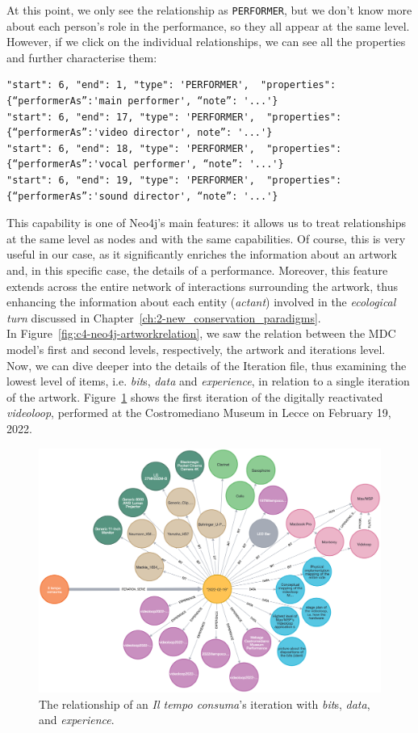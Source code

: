 At this point, we only see the relationship as \texttt{PERFORMER}, but we don’t know more about each person's role in the performance, so they all appear at the same level. However, if we click on the individual relationships, we can see all the properties and further characterise them:
\begin{lstlisting}[style=json]
"start": 6, "end": 1, "type": 'PERFORMER',  "properties": {“performerAs”:'main performer', “note”: '...'}
"start": 6, "end": 17, "type": 'PERFORMER',  "properties": {“performerAs”:'video director', note”: '...'}
"start": 6, "end": 18, "type": 'PERFORMER',  "properties": {“performerAs”:'vocal performer', “note”: '...'}
"start": 6, "end": 19, "type": 'PERFORMER',  "properties": {“performerAs”:'sound director', “note”: '...'}
\end{lstlisting}
This capability is one of Neo4j's main features: it allows us to treat relationships at the same level as nodes and with the same capabilities. Of course, this is very useful in our case, as it significantly enriches the information about an artwork and, in this specific case, the details of a performance. Moreover, this feature extends across the entire network of interactions surrounding the artwork, thus enhancing the information about each entity (\textit{actant}) involved in the \textit{ecological turn} discussed in Chapter~\ref{ch:2-new_conservation_paradigms}.\\
In Figure~\ref{fig:c4-neo4j-artworkrelation}, we saw the relation between the MDC model's first and second levels, respectively, the artwork and iterations level. Now, we can dive deeper into the details of the Iteration file, thus examining the lowest level of items, i.e. \textit{bit}s, \textit{data} and \textit{experience}, in relation to a single iteration of the artwork. Figure~\ref{fig:c4-neo4j-iteration} shows the first iteration of the digitally reactivated \textit{videoloop}, performed at the Costromediano Museum in Lecce on February 19, 2022.

\begin{figure}[!h]
    \centering
    \includegraphics[width=1\linewidth]{chapters/4-MDC_model_application/image/neo4j-iteration.png}
    \caption{The relationship of an \textit{Il tempo consuma}'s iteration with \textit{bit}s, \textit{data}, and \textit{experience}.}
    \label{fig:c4-neo4j-iteration}
\end{figure}


